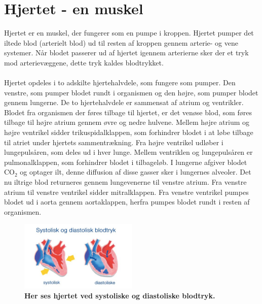 \chapter{Hjertet - en muskel}
Hjertet er en muskel, der fungerer som en pumpe i kroppen. Hjertet pumper det iltede blod (arterielt blod) ud til resten af kroppen gennem arterie- og vene systemer. Når blodet passerer ud af hjertet igennem arterierne sker der et tryk mod arterievæggene, dette tryk kaldes blodtrykket. \\\\
Hjertet opdeles i to adskilte hjertehalvdele, som fungere som pumper. Den venstre, som pumper blodet rundt i organismen og den højre, som pumper blodet gennem lungerne. De to hjertehalvdele er sammensat af atrium og ventrikler. Blodet fra organismen der føres tilbage til hjertet, er det venøse blod, som føres tilbage til højre atrium gennem øvre og nedre hulvene. Mellem højre atrium og højre ventrikel sidder trikuspidalklappen, som forhindrer blodet i at løbe tilbage til atriet under hjertets sammentrækning. Fra højre ventrikel udløber i lungepulsåren, som deles ud i hver lunge. Mellem ventriklen og lungepulsåren er pulmonalklappen, som forhindrer blodet i tilbageløb. I lungerne afgiver blodet CO$_{2}$ og optager ilt, denne diffusion af disse gasser sker i lungernes alveoler. Det nu iltrige blod returneres gennem lungevenerne til venstre atrium. Fra venstre atrium til venstre ventrikel sidder mitralklappen. Fra venstre ventrikel pumpes blodet ud i aorta gennem aortaklappen, herfra pumpes blodet rundt i resten af organismen. \cite{hjertedsd}
\begin{figure}[H]
\includegraphics[width =0.5\textwidth , center]{billeder/sysdia}
\caption{\textbf{Her ses hjertet ved systoliske og diastoliske blodtryk.}}
\end{figure}
